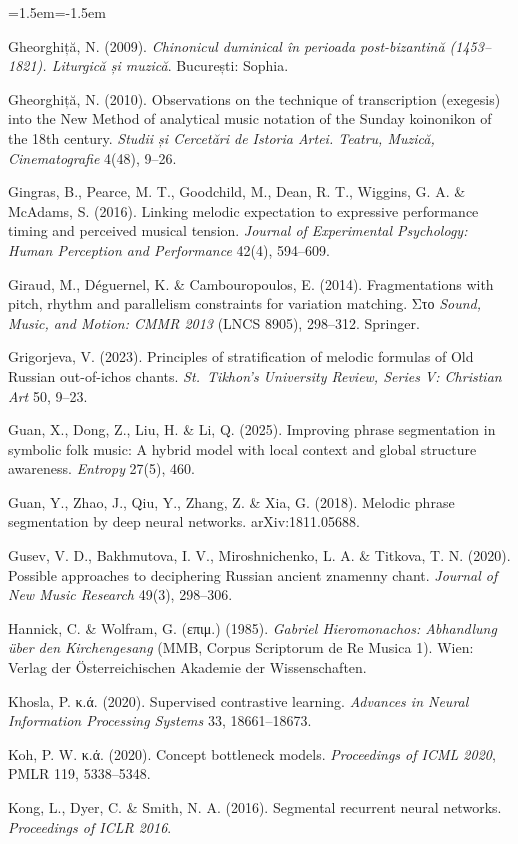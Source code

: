 \documentclass[11pt,a4paper]{article}
\begin{document}
\begin{list}{}{\leftmargin=1.5em\itemindent=-1.5em\itemsep=1pt}
\item Gheorghiță, N. (2009). \emph{Chinonicul duminical în perioada post-bizantină (1453--1821). Liturgică și muzică}. București: Sophia.
\item Gheorghiță, N. (2010). Observations on the technique of transcription (exegesis) into the New Method of analytical music notation of the Sunday koinonikon of the 18th century. \emph{Studii și Cercetări de Istoria Artei. Teatru, Muzică, Cinematografie} 4(48), 9--26.
\item Gingras, B., Pearce, M. T., Goodchild, M., Dean, R. T., Wiggins, G. A. \& McAdams, S. (2016). Linking melodic expectation to expressive performance timing and perceived musical tension. \emph{Journal of Experimental Psychology: Human Perception and Performance} 42(4), 594--609.
\item Giraud, M., Déguernel, K. \& Cambouropoulos, E. (2014). Fragmentations with pitch, rhythm and parallelism constraints for variation matching. Στο \emph{Sound, Music, and Motion: CMMR 2013} (LNCS 8905), 298--312. Springer.
\item Grigorjeva, V. (2023). Principles of stratification of melodic formulas of Old Russian out-of-ichos chants. \emph{St.~Tikhon's University Review, Series V: Christian Art} 50, 9--23.
\item Guan, X., Dong, Z., Liu, H. \& Li, Q. (2025). Improving phrase segmentation in symbolic folk music: A hybrid model with local context and global structure awareness. \emph{Entropy} 27(5), 460.
\item Guan, Y., Zhao, J., Qiu, Y., Zhang, Z. \& Xia, G. (2018). Melodic phrase segmentation by deep neural networks. arXiv:1811.05688.
\item Gusev, V. D., Bakhmutova, I. V., Miroshnichenko, L. A. \& Titkova, T. N. (2020). Possible approaches to deciphering Russian ancient znamenny chant. \emph{Journal of New Music Research} 49(3), 298--306.
\item Hannick, C. \& Wolfram, G. (επιμ.) (1985). \emph{Gabriel Hieromonachos: Abhandlung über den Kirchengesang} (MMB, Corpus Scriptorum de Re Musica 1). Wien: Verlag der Österreichischen Akademie der Wissenschaften.
\item Khosla, P. κ.ά. (2020). Supervised contrastive learning. \emph{Advances in Neural Information Processing Systems} 33, 18661--18673.
\item Koh, P. W. κ.ά. (2020). Concept bottleneck models. \emph{Proceedings of ICML 2020}, PMLR 119, 5338--5348.
\item Kong, L., Dyer, C. \& Smith, N. A. (2016). Segmental recurrent neural networks. \emph{Proceedings of ICLR 2016}.

\end{list}
\end{document}
